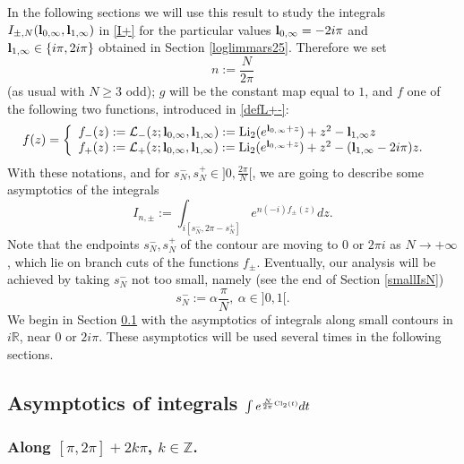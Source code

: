 \documentclass[11pt]{amsart}
\newcommand{\mr}{\mathbb{R}}
\newcommand{\mz}{\mathbb{Z}}
\newcommand{\bl}{{\bf l}}
\begin{document}
{In the following sections we will use this result to study the integrals $I_{\pm,N}(\bl_{0,\infty},\bl_{1,\infty})$ in \eqref{I+} for the particular values $\bl_{0,\infty}=-2i \pi$ and $\bl_{1,\infty}\in \{i \pi,2i\pi\}$ obtained in Section \ref{loglimmars25}. Therefore we set $$n:=\frac{N}{2\pi}$$
(as usual with $N\geq 3$ odd); $g$ will be the constant map equal to $1$, and $f$ one of the following two functions, introduced in \eqref{defL+-}:
\begin{equation}\label{defL+-modif}
	f(z) = \left\lbrace
	\begin{array}{ll}
		f_-(z):= \mathcal{L}_-(z;\bl_{0,\infty},\bl_{1,\infty}) := {\rm Li}_2(e^{\bl_{0,\infty} + z})+z^2- \bl_{1,\infty} z& 
		\\
		f_+(z) := \mathcal{L}_+(z;\bl_{0,\infty},\bl_{1,\infty}) := {\rm Li}_2(e^{\bl_{0,\infty} + z})+z^2 -(\bl_{1,\infty}-2i\pi) z . 
		\end{array}\right.
\end{equation}
With these notations, and for $\textstyle s_N^-,s_N^+\in ]0,\frac{2\pi}{N}[$, we are going to describe some asymptotics of the integrals
\begin{equation}\label{notInjui25} I_{n,\pm} :=  \int_{i[s_N^-,2\pi-s_N^+]}  e^{n(-i) f_{\pm}(z)} dz.
\end{equation}
Note that the endpoints $s_N^-,s_N^+$ of the contour are moving to $0$ or $2\pi i$ as $N\rightarrow +\infty$, which lie on branch cuts of the functions $f_\pm$. Eventually, our analysis will be achieved by taking $s_N^-$ not too small, namely (see the end of Section \ref{smallIsN})
\begin{equation}\label{sNvalue}
s_N^- := \alpha \frac{\pi}{N},\ \alpha\in ]0,1[.
\end{equation}
We begin in Section \ref{sub:small:vert:int} with the asymptotics of integrals along small contours in $i\mr$, near $0$ or $2i\pi$. These asymptotics will be used several times in the following sections.

\subsection{Asymptotics of integrals $\textstyle \int e^{\scriptscriptstyle{\frac{N}{2\pi} {\rm Cl}_2(t)}}dt$ }\label{sub:small:vert:int}

\subsubsection{Along $[\pi,2\pi]+2k\pi$, $k\in \mz$.}\label{smallpijuil25}

}
\end{document}

